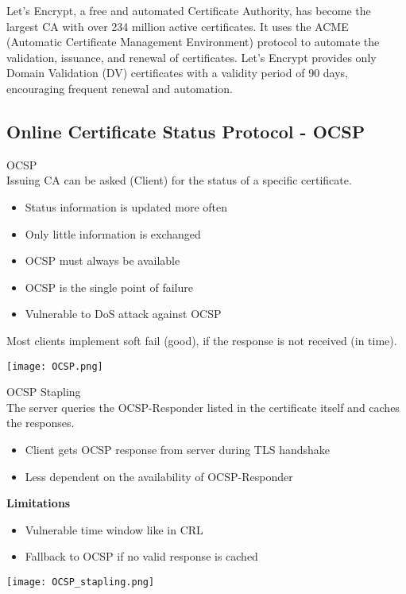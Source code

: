 \begin{example}
Let's Encrypt, a free and automated Certificate Authority, has become the largest CA with over 234 million active certificates. It uses the ACME (Automatic Certificate Management Environment) protocol to automate the validation, issuance, and renewal of certificates. Let's Encrypt provides only Domain Validation (DV) certificates with a validity period of 90 days, encouraging frequent renewal and automation.
\end{example}


\subsection{Online Certificate Status Protocol - OCSP}


\begin{definition}{OCSP}\\
    Issuing CA can be asked (Client) for the status of a specific certificate.
    \begin{itemize}
        \item Status information is updated more often
        \item Only little information is exchanged
        \item OCSP must always be available
        \item OCSP is the single point of failure
        \item Vulnerable to DoS attack against OCSP
    \end{itemize}
    
    Most clients implement soft fail (good), if the response is not received (in time).

    \texttt{[image: OCSP.png]}
\end{definition}



\begin{concept}{OCSP Stapling}\\
    The server queries the OCSP-Responder listed in the certificate itself and caches the responses.
    \begin{itemize}
        \item Client gets OCSP response from server during TLS handshake
        \item Less dependent on the availability of OCSP-Responder
    \end{itemize}
    
    \textbf{Limitations}
    \begin{itemize}
        \item Vulnerable time window like in CRL
        \item Fallback to OCSP if no valid response is cached
    \end{itemize}

    \texttt{[image: OCSP\_stapling.png]}
\end{concept}

\multend
